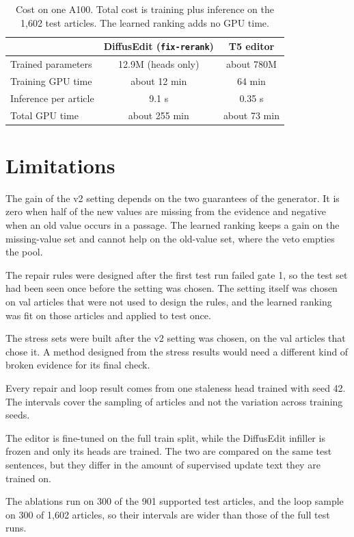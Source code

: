 \documentclass[]{paper}
\newcommand{\run}[1]{\texttt{#1}}
\begin{document}
\begin{table}[H]
\caption{Cost on one A100. Total cost is training plus inference on the 1,602 test articles. The learned ranking adds no GPU time.}
\label{tab:cost}
\centering
\footnotesize
\begin{tabular}{lcc}
\toprule
 & DiffusEdit (\run{fix-rerank}) & T5 editor \\
\midrule
Trained parameters & 12.9M (heads only) & about 780M \\
Training GPU time & about 12 min & 64 min \\
Inference per article & 9.1 s & 0.35 s \\
Total GPU time & about 255 min & about 73 min \\
\bottomrule
\end{tabular}
\end{table}

\section{Limitations}
\label{sec:limits}

The gain of the v2 setting depends on the two guarantees of the generator. It is zero when half of the new values are missing from the evidence and negative when an old value occurs in a passage. The learned ranking keeps a gain on the missing-value set and cannot help on the old-value set, where the veto empties the pool.

The repair rules were designed after the first test run failed gate 1, so the test set had been seen once before the setting was chosen. The setting itself was chosen on val articles that were not used to design the rules, and the learned ranking was fit on those articles and applied to test once.

The stress sets were built after the v2 setting was chosen, on the val articles that chose it. A method designed from the stress results would need a different kind of broken evidence for its final check.

Every repair and loop result comes from one staleness head trained with seed 42. The intervals cover the sampling of articles and not the variation across training seeds.

The editor is fine-tuned on the full train split, while the DiffusEdit infiller is frozen and only its heads are trained. The two are compared on the same test sentences, but they differ in the amount of supervised update text they are trained on.

The ablations run on 300 of the 901 supported test articles, and the loop sample on 300 of 1,602 articles, so their intervals are wider than those of the full test runs.



\end{document}
